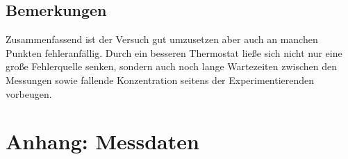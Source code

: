 \subsection[]{Bemerkungen}
Zusammenfassend ist der Versuch gut umzusetzen aber auch an manchen Punkten fehleranfällig.
Durch ein besseren Thermostat ließe sich nicht nur eine große Fehlerquelle senken,
sondern auch noch lange Wartezeiten zwischen den Messungen sowie fallende Konzentration seitens der Experimentierenden vorbeugen.



\section*{Anhang: Messdaten}

\printbibliography

